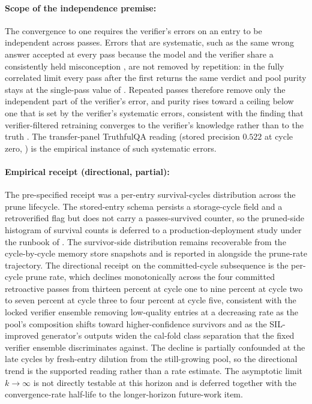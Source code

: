 \paragraph{Scope of the independence premise:} The convergence to one requires the verifier's errors on an entry to be independent across passes. Errors that are systematic, such as the same wrong answer accepted at every pass because the model and the verifier share a consistently held misconception \cite{farquhar2024semantic}, are not removed by repetition: in the fully correlated limit every pass after the first returns the same verdict and pool purity stays at the single-pass value of . Repeated passes therefore remove only the independent part of the verifier's error, and purity rises toward a ceiling below one that is set by the verifier's systematic errors, consistent with the finding that verifier-filtered retraining converges to the verifier's knowledge rather than to the truth \cite{fu2025collapse}. The transfer-panel TruthfulQA reading (stored precision $0.522$ at cycle zero, ) is the empirical instance of such systematic errors.

\paragraph{Empirical receipt (directional, partial):} The pre-specified receipt was a per-entry survival-cycles distribution across the prune lifecycle. The stored-entry schema persists a storage-cycle field and a retroverified flag but does not carry a passes-survived counter, so the pruned-side histogram of survival counts is deferred to a production-deployment study under the runbook of . The survivor-side distribution remains recoverable from the cycle-by-cycle memory store snapshots and is reported in  alongside the prune-rate trajectory. The directional receipt on the committed-cycle subsequence is the per-cycle prune rate, which declines monotonically across the four committed retroactive passes from thirteen percent at cycle one to nine percent at cycle two to seven percent at cycle three to four percent at cycle five, consistent with the locked verifier ensemble removing low-quality entries at a decreasing rate as the pool's composition shifts toward higher-confidence survivors and as the SIL-improved generator's outputs widen the cal-fold class separation that the fixed verifier ensemble discriminates against. The decline is partially confounded at the late cycles by fresh-entry dilution from the still-growing pool, so the directional trend is the supported reading rather than a rate estimate. The asymptotic limit $k \to \infty$ is not directly testable at this horizon and is deferred together with the convergence-rate half-life to the longer-horizon future-work item.

